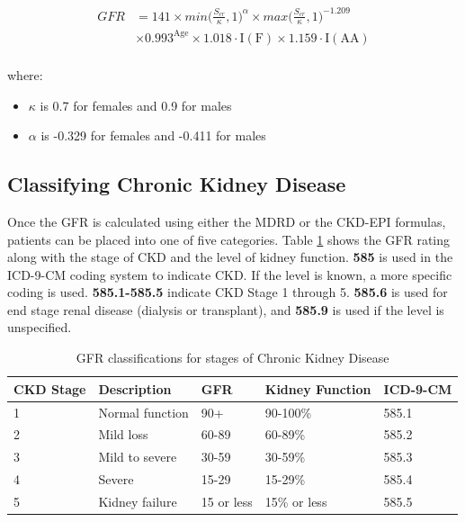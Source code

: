 \documentclass[12pt]{ociamthesis}\usepackage[]{graphicx}\usepackage[]{color}
\begin{document}
\begin{equation} \label{ckdepi}
\begin{split}
  GFR &= 141 \times min\bigg(\frac{S_{cr}}{\kappa}, 1\bigg)^{\alpha} \times max\bigg(\frac{S_{cr}}{\kappa}, 1\bigg)^{-1.209} \\
      &\times 0.993^{\text{Age}} \times 1.018 \cdot \text{I}(\text{F}) \times 1.159 \cdot \text{I}(\text{AA}) \\
\end{split}
\end{equation}

where:
\begin{itemize}
  \item $\kappa$ is 0.7 for females and 0.9 for males
  \item $\alpha$ is -0.329 for females and -0.411 for males
\end{itemize} 

\subsection{Classifying Chronic Kidney Disease}

Once the GFR is calculated using either the MDRD or the CKD-EPI formulas, 
patients can be placed into one of five categories. Table \ref{tab:gfr} shows the 
GFR rating along with the stage of CKD and the level of kidney function. \textbf{585} is used in the ICD-9-CM coding system
to indicate CKD. If the level is known, a more specific coding is used. \textbf{585.1-585.5} indicate CKD Stage 1 through 5.
\textbf{585.6} is used for end stage renal disease (dialysis or transplant), and \textbf{585.9} is used if the level is unspecified.

\begin{table}[]
\centering
\label{my-label}
\begin{tabular}{lllll}
CKD Stage & Description             & GFR        & Kidney Function & ICD-9-CM \\
\hline
1         & Normal function         & 90+        & 90-100\%        & 585.1    \\
2         & Mild loss               & 60-89      & 60-89\%         & 585.2    \\
3         & Mild to severe          & 30-59      & 30-59\%         & 585.3    \\
4         & Severe                  & 15-29      & 15-29\%         & 585.4    \\
5         & Kidney failure          & 15 or less & 15\% or less    & 585.5    \\
\end{tabular}\caption{GFR classifications for stages of Chronic Kidney Disease}\label{tab:gfr}
\end{table}
\end{document}
